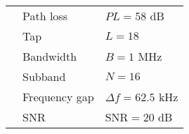 \begin{table}[h!]
\begin{tabular}{lll}
                              & Path loss                          & $PL = 58$ dB                         \\
                              & Tap                                & $L = 18$                             \\
                              & Bandwidth                          & $B = 1$ MHz                          \\
                              & Subband                            & $N = 16$                             \\
                              & Frequency gap                      & $\Delta f = 62.5$ kHz                \\
                              & SNR                                & $\text{SNR} = 20$ dB
\end{tabular}
\label{tab:reference_parameters}
\end{table} 